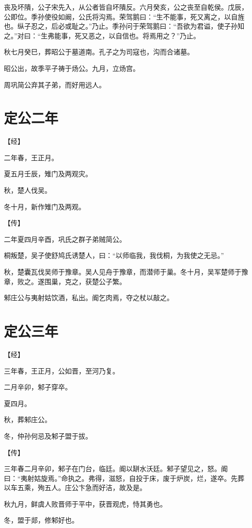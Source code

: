 \documentclass[a4paper,12pt,UTF8,twoside]{ctexbook}
\begin{document}
丧及坏隤，公子宋先入，从公者皆自坏隤反。六月癸亥，公之丧至自乾侯。戊辰，公即位。季孙使役如阚，公氏将沟焉。荣驾鹅曰：“生不能事，死又离之，以自旌也。纵子忍之，后必或耻之。”乃止。季孙问于荣驾鹅曰：“吾欲为君谥，使子孙知之。”对曰：“生弗能事，死又恶之，以自信也。将焉用之？”乃止。

秋七月癸巳，葬昭公于墓道南。孔子之为司寇也，沟而合诸墓。

昭公出，故季平子祷于炀公。九月，立炀宫。

周巩简公弃其子弟，而好用远人。


\chapter{定公二年}


【经】

二年春，王正月。

夏五月壬辰，雉门及两观灾。

秋，楚人伐吴。

冬十月，新作雉门及两观。

【传】

二年夏四月辛酉，巩氏之群子弟贼简公。

桐叛楚，吴子使舒鸠氏诱楚人，曰：“以师临我，我伐桐，为我使之无忌。”

秋，楚囊瓦伐吴师于豫章。吴人见舟于豫章，而潜师于巢。冬十月，吴军楚师于豫章，败之。遂围巢，克之，获楚公子繁。

邾庄公与夷射姑饮酒，私出。阍乞肉焉，夺之杖以敲之。


\chapter{定公三年}




【经】

三年春，王正月，公如晋，至河乃复。

二月辛卯，邾子穿卒。

夏四月。

秋，葬邾庄公。

冬，仲孙何忌及邾子盟于拔。

【传】

三年春二月辛卯，邾子在门台，临廷。阍以缾水沃廷。邾子望见之，怒。阍曰：“夷射姑旋焉。”命执之。弗得，滋怒，自投于床，废于炉炭，烂，遂卒。先葬以车五乘，殉五人。庄公卞急而好洁，故及是。

秋九月，鲜虞人败晋师于平中，获晋观虎，恃其勇也。

冬，盟于郯，修邾好也。
\end{document}
